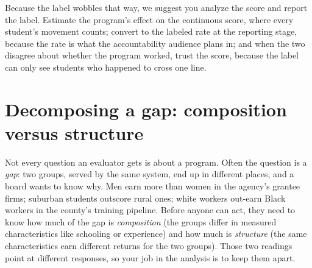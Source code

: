 \documentclass[
    a4paper,
    fontsize=10pt,
    twoside=true,
    numbers=noenddot,
]{kaobook}
\begin{document}
Because the label wobbles that way, we suggest you analyze the score and report the label. Estimate the program's effect on the continuous score, where every student's movement counts; convert to the labeled rate at the reporting stage, because the rate is what the accountability audience plans in; and when the two disagree about whether the program worked, trust the score, because the label can only see students who happened to cross one line.

\section{Decomposing a gap: composition versus structure}\label{sec:oaxaca}
Not every question an evaluator gets is about a program. Often the question is a \emph{gap}: two groups, served by the same system, end up in different places, and a board wants to know why. Men earn more than women in the agency's grantee firms; suburban students outscore rural ones; white workers out-earn Black workers in the county's training pipeline. Before anyone can act, they need to know how much of the gap is \emph{composition} (the groups differ in measured characteristics like schooling or experience) and how much is \emph{structure} (the same characteristics earn different returns for the two groups). Those two readings point at different responses, so your job in the analysis is to keep them apart.
\end{document}
